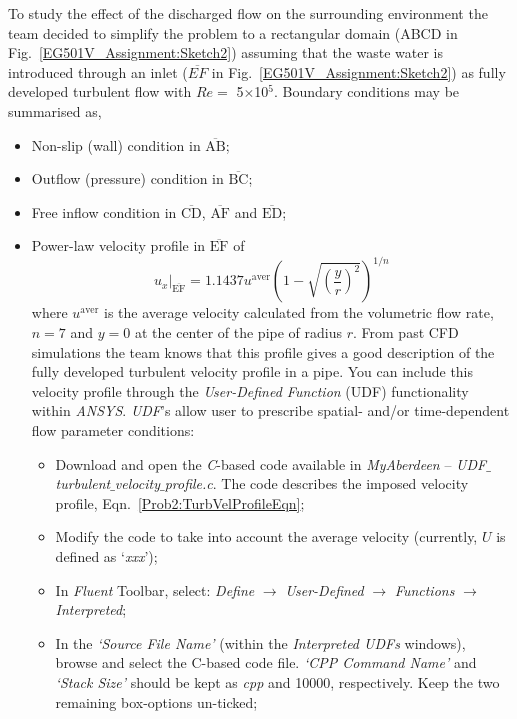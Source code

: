 \documentclass[12pts,a4paper,amsmath,amssymb,floatfix]{article}%
\begin{document}
\begin{enumerate}[label=\bfseries Problem \arabic*:]
To study the effect of the discharged flow on the surrounding environment the team decided to simplify the problem to a rectangular domain (ABCD in Fig.~\ref{EG501V_Assignment:Sketch2}) assuming that the waste water is introduced through an inlet ($\overline{EF}$ in Fig.~\ref{EG501V_Assignment:Sketch2}) as fully developed turbulent flow with $Re=$ 5$\times$10$^{5}$. Boundary conditions may be summarised as,
\begin{itemize}
  \item Non-slip (wall) condition in $\overline{\text{AB}}$;
  \item Outflow (pressure) condition in  $\overline{\text{BC}}$;
  \item Free inflow condition in  $\overline{\text{CD}}$, $\overline{\text{AF}}$ and $\overline{\text{ED}}$;
  \item Power-law velocity profile in $\overline{\text{EF}}$ of
    \begin{equation}
        \left.u_{x}\right|_{\overline{\text{EF}}} = 1.1437 u^{\text{aver}} \left(1 - \sqrt{\left(\frac{y}{r}\right)^{2}}\right)^{1/n} \label{Prob2:TurbVelProfileEqn}
    \end{equation}
    where $u^{\text{aver}}$ is the average velocity calculated from the volumetric flow rate, $n=7$ and $y=0$ at the center of the pipe of radius $r$. From past CFD simulations the team knows that this profile gives a good description of the fully developed turbulent velocity profile in a pipe. You can include this velocity profile through the {\it User-Defined Function} (UDF) functionality within {\it ANSYS}. {\it UDF}'s allow user to prescribe spatial- and/or time-dependent flow parameter conditions:
    \begin{itemize}
        \item Download and open the {\it C}-based code available in {\it MyAberdeen} -- {\it UDF$\_$turbulent$\_$velocity$\_$profile.c}. The code describes the imposed velocity profile, Eqn.~\ref{Prob2:TurbVelProfileEqn};
        \item Modify the code to take into account the average velocity (currently, $U$ is defined as `{\it xxx}');
        \item In {\it Fluent} Toolbar, select: {\it Define} $\rightarrow$ {\it User-Defined} $\rightarrow$ {\it Functions} $\rightarrow$ {\it Interpreted};
        \item In the {\it `Source File Name'} (within the {\it Interpreted UDFs} windows), browse and select the C-based code file. {\it `CPP Command Name'} and {\it `Stack Size'}  should be kept as {\it cpp} and 10000, respectively. Keep the two remaining box-options un-ticked;

\end{itemize}
\end{itemize}
\end{enumerate}
\end{document}
